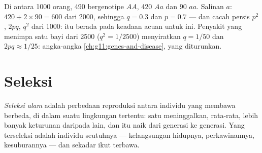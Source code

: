 \begin{example}\label{ex:g12:selection-drift-speciation:count}
Di antara 1000 orang, 490 bergenotipe $AA$, 420 $Aa$ dan 90 $aa$. Salinan $a$:
$420 + 2 \times 90 = 600$ dari 2000, sehingga $q = 0.3$ dan $p = 0.7$ ---
dan cacah  persis $p^2$, $2pq$, $q^2$ dari 1000: 
itu berada pada keadaan acuan untuk  ini. Penyakit  yang
menimpa satu bayi dari 2500 ($q^2 = 1/2500$) menyiratkan $q = 1/50$ dan
 $2pq \approx 1/25$: angka-angka
\cref{ch:g11:genes-and-disease}, yang diturunkan.
\end{example}

\section{Seleksi}

\begin{definition}\label{def:g12:selection-drift-speciation:selection}
\emph{Seleksi alam} adalah perbedaan reproduksi
antara individu yang membawa  berbeda, di dalam suatu lingkungan
tertentu:  satu  meninggalkan, rata-rata, lebih banyak
keturunan daripada   lain, dan  itu naik dari
generasi ke generasi. Yang terseleksi adalah individu seutuhnya ---
kelangsungan hidupnya, perkawinannya, kesuburannya --- dan 
sekadar ikut terbawa.
\end{definition}

